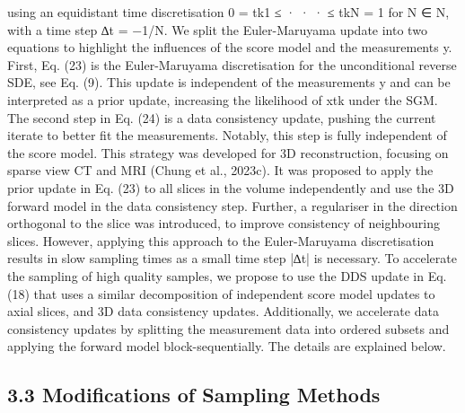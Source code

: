 \documentclass{article}
\begin{document}
using an equidistant time discretisation 0 = tk1 ≤ · · · ≤ tkN = 1 for N ∈ N, with a time step ∆t = −1/N. We split the Euler-Maruyama update into two equations to highlight the influences of the score model and the measurements y. First, Eq. (23) is the Euler-Maruyama discretisation for the unconditional reverse SDE, see Eq. (9). This update is independent of the measurements y and can be interpreted as a prior update, increasing the likelihood of xtk under the SGM. The second step in Eq. (24) is a data consistency update, pushing the current iterate to better fit the measurements. Notably, this step is fully independent of the score model. This strategy was developed for 3D reconstruction, focusing on sparse view CT and MRI (Chung et al., 2023c). It was proposed to apply the prior update in Eq. (23) to all slices in the volume independently and use the 3D forward model in the data consistency step. Further, a regulariser in the direction orthogonal to the slice was introduced, to improve consistency of neighbouring slices. However, applying this approach to the Euler-Maruyama discretisation results in slow sampling times as a small time step |∆t| is necessary. To accelerate the sampling of high quality samples, we propose to use the DDS update in Eq. (18) that uses a similar decomposition of independent score model updates to axial slices, and 3D data consistency updates. Additionally, we accelerate data consistency updates by splitting the measurement data into ordered subsets and applying the forward model block-sequentially. The details are explained below.

\subsection{3.3 Modifications of Sampling Methods}
\end{document}
